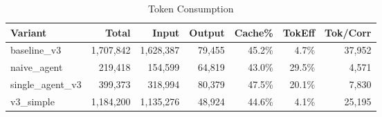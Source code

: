 \begin{table}[htbp]
\centering
\caption{Token Consumption}
\label{tab:tokens}
\begin{tabular}{l rrrr rr}
\toprule
Variant & Total & Input & Output & Cache\% & TokEff & Tok/Corr \\
\midrule
  baseline\_v3 & 1,707,842 & 1,628,387 & 79,455 & 45.2\% & 4.7\% & 37,952 \\
  naive\_agent & 219,418 & 154,599 & 64,819 & 43.0\% & 29.5\% & 4,571 \\
  single\_agent\_v3 & 399,373 & 318,994 & 80,379 & 47.5\% & 20.1\% & 7,830 \\
  v3\_simple & 1,184,200 & 1,135,276 & 48,924 & 44.6\% & 4.1\% & 25,195 \\
\bottomrule
\end{tabular}
\end{table}
